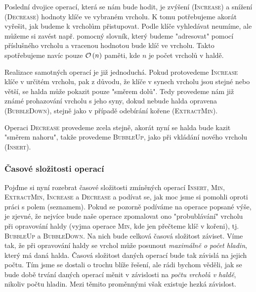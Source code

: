 Poslední dvojice operací, která se nám bude hodit, je zvýšení (\textsc{Increase}) a snížení (\textsc{Decrease}) hodnoty klíče ve vybraném vrcholu. K tomu potřebujeme akorát vyřešit, jak budeme k vrcholům přistupovat. Podle klíče vyhledávat neumíme, ale můžeme si zavést např. pomocný slovník, který budeme "adresovat" pomocí příslušného vrcholu a vracenou hodnotou bude klíč ve vrcholu. Takto spotřebujeme navíc pouze $\mathcal{O}\left(n\right)$ paměti, kde $n$ je počet vrcholů v haldě.

Realizace samotných operací je již jednoduchá. Pokud protovedeme \textsc{Increase} klíče v určitém vrcholu, pak z důvodu, že klíče v synech vrcholu jsou stejné nebo větší, se halda může pokazit pouze "směrem dolů". Tedy provedeme nám již známé prohazování vrcholu s jeho syny, dokud nebude halda opravena (\textsc{BubbleDown}), stejně jako v případě odebírání kořene (\textsc{ExtractMin}).

Operaci \textsc{Decrease} provedeme zcela stejně, akorát nyní se halda bude kazit "směrem nahoru", takže provedeme \textsc{BubbleUp}, jako při vkládání nového vrcholu (\textsc{Insert}).

\subsubsection{Časové složitosti operací}

Pojďme si nyní rozebrat časové složitosti zmíněných operací \textsc{Insert}, \textsc{Min}, \textsc{ExtractMin}, \textsc{Increase} a \textsc{Decrease} a podívat se, jak moc jsme si pomohli oproti práci s polem (seznamem). Pokud se pozorně podíváme na operace popsané výše, je zjevné, že nejvíce bude naše operace zpomalovat ono "probublávání" vrcholu při opravování haldy (vyjma operace \textsc{Min}, kde jen přečteme klíč v kořeni), tj. \textsc{BubbleUp} a \textsc{BubbleDown}. Na nich bude celková časová složitost záviset.
Víme tak, že při opravování haldy se vrchol může posunout \emph{maximálně o počet hladin}, který má daná halda. Časová složitost daných operací bude tak závislá na jejich počtu. Tím jsme se dostali o trochu blíže řešení, ale rádi bychom věděli, jak se bude době trvání daných operací měnit v závislosti na \emph{počtu vrcholů v haldě}, nikoliv počtu hladin. Mezi těmito proměnnými však existuje hezká závislost.

